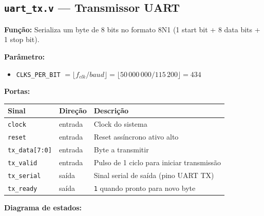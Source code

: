 \documentclass[12pt,a4paper]{article}
\begin{document}
\subsection{\texttt{uart\_tx.v} — Transmissor UART}

\textbf{Função:} Serializa um byte de 8 bits no formato 8N1 (1 start bit + 8 data bits + 1 stop bit).

\textbf{Parâmetro:}
\begin{itemize}
    \item \texttt{CLKS\_PER\_BIT} $= \lfloor f_{clk} / \mathit{baud} \rfloor = \lfloor 50\,000\,000 / 115\,200 \rfloor = 434$
\end{itemize}

\textbf{Portas:}
\begin{center}
\begin{tabular}{lll}
\toprule
\textbf{Sinal} & \textbf{Direção} & \textbf{Descrição} \\
\midrule
\texttt{clock}     & entrada & Clock do sistema \\
\texttt{reset}     & entrada & Reset assíncrono ativo alto \\
\texttt{tx\_data[7:0]} & entrada & Byte a transmitir \\
\texttt{tx\_valid} & entrada & Pulso de 1 ciclo para iniciar transmissão \\
\texttt{tx\_serial}& saída   & Sinal serial de saída (pino UART TX) \\
\texttt{tx\_ready} & saída   & \texttt{1} quando pronto para novo byte \\
\bottomrule
\end{tabular}
\end{center}

\textbf{Diagrama de estados:}
\begin{center}
\end{center}
\end{document}
